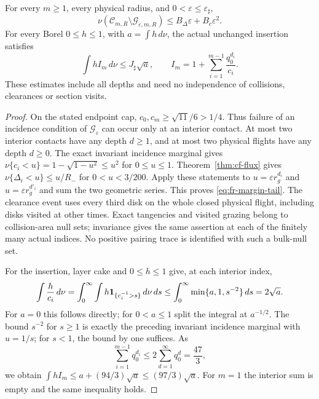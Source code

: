\begin{lemma}
\label{lem:fr-margin-tail}
For every $m\ge1$, every physical radius, and
$0<\varepsilon\le\varepsilon_\sharp$,
\begin{equation}\label{eq:fr-margin-tail}
 \nu(\mathcal C_{m,R}\setminus\mathcal G_{\varepsilon,m,R})
       \le B_\Delta\varepsilon+B_c\varepsilon^2.
\end{equation}
For every Borel $0\le h\le1$, with $a=\int h\,d\nu$,
the actual unchanged insertion satisfies
\begin{equation}\label{eq:fr-insertion-tail}
 \int hI_m\,d\nu\le J_\sharp\sqrt a,
 \qquad
 I_m=1+\sum_{i=1}^{m-1}\frac{q_0^{d_i}}{c_i}.
\end{equation}
These estimates include all depths and need no independence of
collisions, clearances or section visits.
\end{lemma}
\begin{proof}
On the stated endpoint cap, $c_0,c_m\ge\sqrt{11}/6>1/4$.
Thus failure of an incidence condition of $\mathcal G_\varepsilon$
can occur only at an interior contact.  At most two interior contacts
have any depth $d\ge1$, and at most two physical flights have any
depth $d\ge0$.  The exact invariant incidence marginal gives
$\nu\{c_i<u\}=1-\sqrt{1-u^2}\le u^2$ for $0\le u\le1$.
Theorem~\ref{thm:cf-flux} gives
$\nu\{\Delta_i<u\}\le u/R_-$ for $0<u<3/200$.
Apply these statements to $u=\varepsilon r_g^{d_i}$ and
$u=\varepsilon r_g^{d'_i}$ and sum the two geometric series.
This proves \eqref{eq:fr-margin-tail}.  The clearance event uses
every third disk on the whole closed physical flight, including disks
visited at other times.  Exact tangencies and visited grazing belong
to collision-area null sets; invariance gives the same assertion at
each of the finitely many actual indices.  No positive pairing trace
is identified with such a bulk-null set.

For the insertion, layer cake and $0\le h\le1$ give, at each
interior index,
\[
 \int\frac{h}{c_i}\,d\nu
  =\int_0^\infty\int h\mathbf1_{\{c_i^{-1}>s\}}\,d\nu\,ds
  \le\int_0^\infty\min\{a,1,s^{-2}\}\,ds=2\sqrt a.
\]
For $a=0$ this follows directly; for $0<a\le1$ split the integral
at $a^{-1/2}$.  The bound $s^{-2}$ for $s\ge1$ is exactly the
preceding invariant incidence marginal with $u=1/s$; for $s<1$,
the bound by one suffices.  As
\[
 \sum_{i=1}^{m-1}q_0^{d_i}
       \le2\sum_{d=1}^\infty q_0^d=\frac{47}{3},
\]
we obtain $\int hI_m\le a+(94/3)\sqrt a\le(97/3)\sqrt a$.
For $m=1$ the interior sum is empty and the same inequality holds.
\end{proof}

